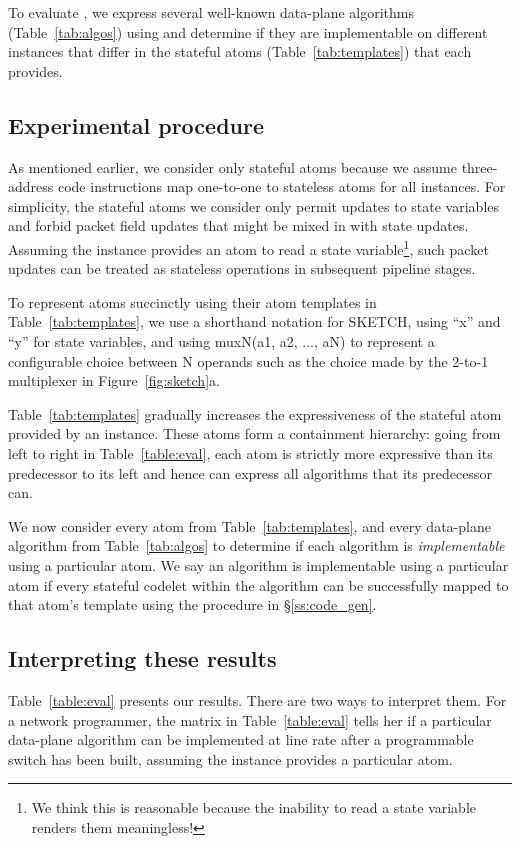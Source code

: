 To evaluate \pktlanguage, we express several well-known data-plane algorithms
(Table~\ref{tab:algos}) using \pktlanguage and determine if they are
implementable on different \absmachine instances that differ in the stateful
atoms (Table~\ref{tab:templates}) that each provides.

\subsection{Experimental procedure}
As mentioned earlier, we consider only stateful atoms because we assume
three-address code instructions map one-to-one to stateless atoms for all
\absmachine instances. For simplicity, the stateful atoms we consider only
permit updates to state variables and forbid packet field updates that might be
mixed in with state updates. Assuming the \absmachine instance provides an atom
to read a state variable\footnote{We think this is reasonable because the
inability to read a state variable renders them meaningless!}, such packet
updates can be treated as stateless operations in subsequent pipeline stages.

To represent atoms succinctly using their atom templates in
Table~\ref{tab:templates}, we use a shorthand notation for SKETCH, using ``x''
and ``y'' for state variables, and using muxN(a1, a2, ..., aN) to represent a
configurable choice between N operands such as the choice made by the 2-to-1
multiplexer in Figure~\ref{fig:sketch}a.

Table~\ref{tab:templates} gradually increases the expressiveness of the
stateful atom provided by an \absmachine instance. These atoms form a
containment hierarchy: going from left to right in Table~\ref{table:eval}, each
atom is strictly more expressive than its predecessor to its left and hence can
express all algorithms that its predecessor can.

We now consider every atom from Table~\ref{tab:templates}, and every data-plane
algorithm from Table~\ref{tab:algos} to determine if each algorithm is
\textit{implementable} using a particular atom. We say an algorithm is
implementable using a particular atom if every stateful codelet within the
algorithm can be successfully mapped to that atom's template using the
procedure in \S\ref{ss:code_gen}.

\subsection{Interpreting these results}
Table~\ref{table:eval} presents our results. There are two ways to interpret
them. For a network programmer, the matrix in Table~\ref{table:eval} tells her
if a particular data-plane algorithm can be implemented at line rate after a
programmable switch has been built, assuming the \absmachine instance provides
a particular atom.

